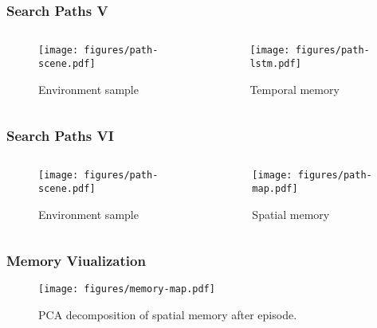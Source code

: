 \begin{frame}[noframenumbering]
    \frametitle{Search Paths V}

    \begin{columns}
        \begin{column}{0.5\textwidth}
            \begin{figure}
                \centering
                \texttt{[image: figures/path-scene.pdf]}
                \par Environment sample
            \end{figure}
        \end{column}
        \begin{column}{0.5\textwidth}
            \begin{figure}
                \centering
                \texttt{[image: figures/path-lstm.pdf]}
                \par Temporal memory
            \end{figure}
        \end{column}
    \end{columns}
\end{frame}

\begin{frame}[noframenumbering]
    \frametitle{Search Paths VI}

    \begin{columns}
        \begin{column}{0.5\textwidth}
            \begin{figure}
                \centering
                \texttt{[image: figures/path-scene.pdf]}
                \par Environment sample
            \end{figure}
        \end{column}
        \begin{column}{0.5\textwidth}
            \begin{figure}
                \centering
                \texttt{[image: figures/path-map.pdf]}
                \par Spatial memory 
            \end{figure}
        \end{column}
    \end{columns}
\end{frame}

\begin{frame}[noframenumbering]
    \frametitle{Memory Viualization}

    \begin{figure}
        \centering
        \texttt{[image: figures/memory-map.pdf]}
        \par PCA decomposition of spatial memory after episode.
    \end{figure}
\end{frame}
